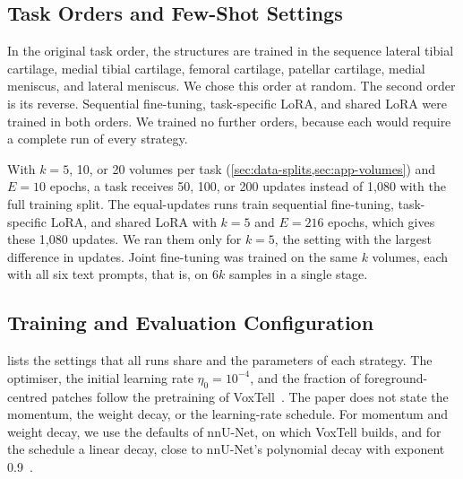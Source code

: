 \subsection{Task Orders and Few-Shot Settings}
\label{subsec:exp-data}

In the original task order, the structures are trained in the sequence lateral tibial cartilage, medial tibial cartilage, femoral cartilage, patellar cartilage, medial meniscus, and lateral meniscus.
We chose this order at random.
The second order is its reverse.
Sequential fine-tuning, task-specific LoRA, and shared LoRA were trained in both orders.
We trained no further orders, because each would require a complete run of every strategy.

\begin{table}[tb] %
\centering
\caption[Overview of the experiments]{Overview of the experiments. Training volumes per task: 108 is the full training split. Objective: number of the research objective in \cref{sec:intro-rq}. All runs use the original task order unless stated otherwise.}
\label{tab:ch6_experiments}

\end{table}

With $k = 5$, 10, or 20 volumes per task (\cref{sec:data-splits,sec:app-volumes}) and $E = 10$ epochs, a task receives 50, 100, or 200 updates instead of 1{,}080 with the full training split.
The equal-updates runs train sequential fine-tuning, task-specific LoRA, and shared LoRA with $k = 5$ and $E = 216$ epochs, which gives these 1{,}080 updates.
We ran them only for $k = 5$, the setting with the largest difference in updates.
Joint fine-tuning was trained on the same $k$ volumes, each with all six text prompts, that is, on $6k$ samples in a single stage.

\subsection{Training and Evaluation Configuration}
\label{subsec:exp-config}

 lists the settings that all runs share and the parameters of each strategy.
The optimiser, the initial learning rate $\eta_0 = 10^{-4}$, and the fraction of foreground-centred patches follow the pretraining of VoxTell~\cite[Suppl.~Sec.~A]{rokuss2025voxtellfreetextpromptableuniversal}.
The paper does not state the momentum, the weight decay, or the learning-rate schedule.
For momentum and weight decay, we use the defaults of nnU-Net, on which VoxTell builds, and for the schedule a linear decay, close to nnU-Net's polynomial decay with exponent 0.9~\cite{isensee2026nnunet}.

